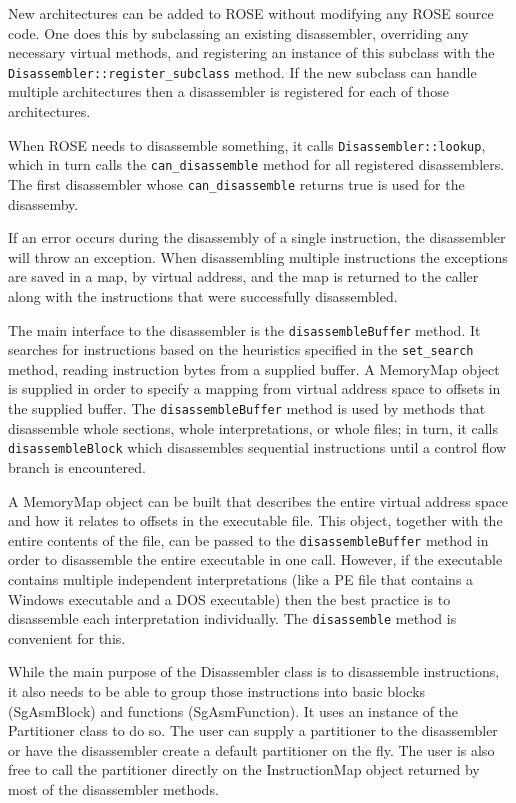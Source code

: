 New architectures can be added to ROSE without modifying any ROSE source code. One does this by subclassing an existing
disassembler, overriding any necessary virtual methods, and registering an instance of this subclass with the
{\tt Disassembler::register\_subclass} method.  If the new subclass can handle multiple architectures then a disassembler is
registered for each of those architectures.

When ROSE needs to disassemble something, it calls {\tt Disassembler::lookup}, which in turn calls the {\tt can\_disassemble}
method for all registered disassemblers.  The first disassembler whose {\tt can\_disassemble} returns true is used for the
disassemby.

If an error occurs during the disassembly of a single instruction, the disassembler will throw an exception. When
disassembling multiple instructions the exceptions are saved in a map, by virtual address, and the map is returned to the
caller along with the instructions that were successfully disassembled.

The main interface to the disassembler is the {\tt disassembleBuffer} method. It searches for instructions based on the
heuristics specified in the {\tt set\_search} method, reading instruction bytes from a supplied buffer.  A MemoryMap object is
supplied in order to specify a mapping from virtual address space to offsets in the supplied buffer. The
{\tt disassembleBuffer} method is used by methods that disassemble whole sections, whole interpretations, or whole files; in
turn, it calls {\tt disassembleBlock} which disassembles sequential instructions until a control flow branch is encountered.

A MemoryMap object can be built that describes the entire virtual address space and how it relates to offsets in the
executable file.  This object, together with the entire contents of the file, can be passed to the {\tt disassembleBuffer}
method in order to disassemble the entire executable in one call.  However, if the executable contains multiple
independent interpretations (like a PE file that contains a Windows executable and a DOS executable) then the best
practice is to disassemble each interpretation individually.  The {\tt disassemble} method is convenient for this.

While the main purpose of the Disassembler class is to disassemble instructions, it also needs to be able to group those
instructions into basic blocks (SgAsmBlock) and functions (SgAsmFunction). It uses an instance of the
Partitioner class to do so.  The user can supply a partitioner to the disassembler or have the disassembler create a
default partitioner on the fly.  The user is also free to call the partitioner directly on the InstructionMap object
returned by most of the disassembler methods.

